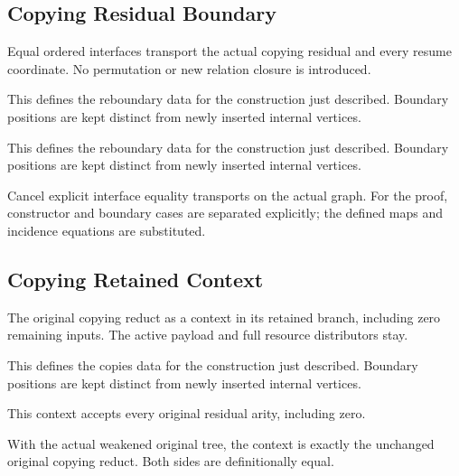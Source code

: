 \subsection{Copying Residual Boundary}
Equal ordered interfaces transport the actual copying residual and every resume coordinate. No permutation or new relation closure is introduced.

This defines the reboundary data for the construction just described. Boundary positions are kept distinct from newly inserted internal vertices.
\par{}

This defines the reboundary data for the construction just described. Boundary positions are kept distinct from newly inserted internal vertices.
\par{}

Cancel explicit interface equality transports on the actual graph.
For the proof, constructor and boundary cases are separated explicitly; the defined maps and incidence equations are substituted.
\par{}

\subsection{Copying Retained Context}
The original copying reduct as a context in its retained branch, including zero remaining inputs. The active payload and full resource distributors stay.

This defines the copies data for the construction just described. Boundary positions are kept distinct from newly inserted internal vertices.
\par{}

This context accepts every original residual arity, including zero.
\par{}

With the actual weakened original tree, the context is exactly the unchanged original copying reduct.
Both sides are definitionally equal.
\par{}

